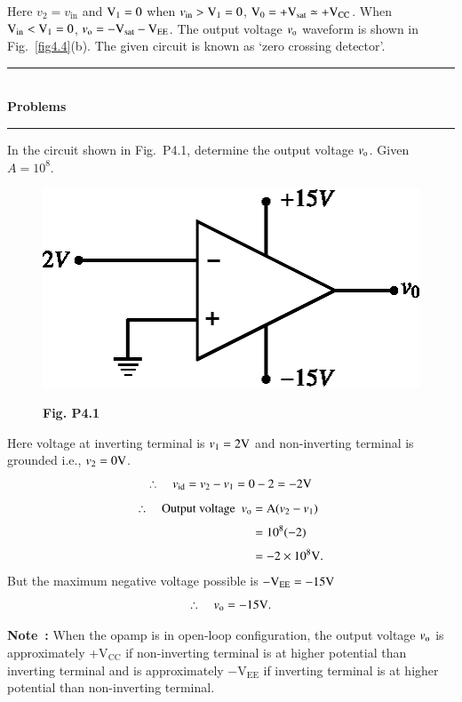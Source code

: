 Here $v_{2}=v_{\text{in}}$ and $\textrm{V}_{1}=0$ when $v_{\text{in}}>\textrm{V}_{1}=0$, $\textrm{V}_{0}=+\textrm{V}_{\text{sat}}\simeq + \textrm{V}_{\text{CC}}$. When $\textrm{V}_{\text{in}}<\textrm{V}_{1}=0$, $v_{\textrm{o}}=-\textrm{V}_{\text{sat}}-\textrm{V}_{\text{EE}}$. The output voltage $v_{\textrm{o}}$ waveform is shown in Fig.~\ref{fig4.4}(b). The given circuit is known as `zero crossing detector'.

\begin{center}
\rule{4cm}{1pt}\\
{\bf\Large Problems}\\[-3pt]
\rule{4cm}{1pt}
\end{center}

\begin{problem}\label{prob4.1}
In the circuit shown in Fig.~P4.1, determine the output voltage $v_{\textrm{o}}$. Given $A=10^{8}$.
\begin{figure}[H]
\centering
\includegraphics{chap4/figP4.1.eps}

\smallskip
{\bf Fig. P4.1}
\end{figure}
\end{problem}

\begin{solution}
Here voltage at inverting terminal is $v_{1}=2\textrm{V}$ and non-inverting terminal is grounded i.e., $v_{2}=0\textrm{V}$.
$$
\therefore\quad v_{\operatorname{id}}=v_{2}-v_{1}=0-2=-2\textrm{V}
$$
\begin{align*}
\therefore\quad \text{Output voltage ~} v_{\textrm{o}} &= \textrm{A} (v_{2}-v_{1})\\[3pt]
                                             &= 10^{8}(-2)\\[3pt]
                                             &= -2\times 10^{8}\textrm{V}.
\end{align*}
But the maximum negative voltage possible is $-\textrm{V}_{\text{EE}}=-15\textrm{V}$
$$
\therefore\quad v_{\textrm{o}}=-15\textrm{V}.
$$
\end{solution}

\noindent
{\bf Note~:} When the opamp is in open-loop configuration, the output voltage $v_{\textrm{o}}$ is approximately +V$_{\text{CC}}$ if non-inverting terminal is at higher potential than inverting terminal and is approximately $-$V$_{\text{EE}}$ if inverting terminal is at higher potential than non-inverting terminal.

